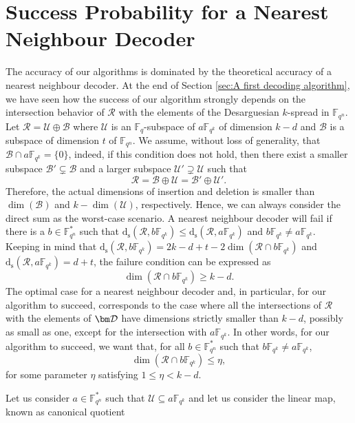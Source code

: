 \documentclass{article}
\newcommand{\Fq}{\mathbb{F}_{q}}
\newcommand{\Fqn}{\mathbb{F}_{q^n}}
\newcommand{\Fqk}{\mathbb{F}_{q^k}}
\newcommand{\ds}{\mathrm{d_s}}
\newcommand{\calB}{\mathcal{B}}
\newcommand{\calD}{\mathcal{D}}
\newcommand{\calR}{\mathcal{R}}
\newcommand{\calU}{\mathcal{U}}
\begin{document}
\section{Success Probability for a Nearest Neighbour Decoder}
\label{sec:Probability of success for a minimum distance decoder}
The accuracy of our algorithms is dominated by the theoretical accuracy of a nearest neighbour decoder.
At the end of Section \ref{sec:A first decoding algorithm}, we have seen how the success of our algorithm strongly depends on the intersection behavior of $\calR$ with the elements of the Desarguesian $k$-spread in $\Fqn$. 
Let $\calR =\calU\oplus\calB$ where $\calU$ is an $\Fq$-subspace of $a \Fqk$ of dimension $k-d$ and $\calB$ is a subspace of dimension $t$ of $\Fqn$. We assume, without loss of generality, that $\calB\cap a\Fqk=\{0\}$, indeed, if this condition does not hold, then there exist a smaller subspace $\calB'\subsetneq \calB$ and a larger subspace $\calU'\supsetneq \calU$ such that
\[
\calR=\calB\oplus\calU=\calB'\oplus\calU'.
\]
Therefore, the actual dimensions of insertion and deletion is smaller than $\dim(\calB)$ and $k-\dim(\calU)$, respectively. Hence, we can always consider the direct sum as the worst-case scenario.
A nearest neighbour decoder will fail if there is a $b \in \Fqn^*$ such that $\ds(\calR, b\Fqk) \leq \ds(\calR, a\Fqk)$ and $b \Fqk \neq a \Fqk$.
Keeping in mind that $\ds(\calR, b\Fqk) = 2k - d + t - 2\dim(\calR \cap b\Fqk)$ and $\ds(\calR, a\Fqk) = d+t$, the failure condition can be expressed as
\begin{equation}
\label{eq:min_distance_decoder_failure}
    \dim(\calR \cap b\Fqk) \geq k - d.
\end{equation}
The optimal case for a nearest neighbour decoder and, in particular, for our algorithm to succeed, corresponds to the case where all the intersections of $\calR$ with the elements of $\bm \calD$ have dimensions strictly smaller than $k-d$, possibly as small as one, except for the intersection with $a\Fqk$. In other words, for our algorithm to succeed, we want that, for all 
$b \in \Fqn^*$ such that $b\Fqk \neq a\Fqk$, 
\begin{equation}
\label{eq:min_distance_decoder_maybe_success}
    \dim(\calR \cap b\Fqk) \leq \eta,
\end{equation}
for some parameter $\eta$ satisfying $1 \leq \eta < k-d$.
\\
\par Let us consider $a\in\Fqn^*$ such that $\calU\subseteq a\Fqk$ and let us consider the linear map, known as canonical quotient
\end{document}
